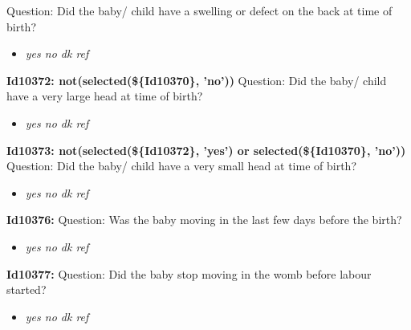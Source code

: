 \documentclass{article}%
\begin{document}
Question: Did the baby/ child have a swelling or defect on the back at time of birth?\newline%
%
\begin{itemize}%
\item%
\textit{yes\newline%
 no\newline%
 dk\newline%
 ref\newline%
}%
\end{itemize}%
\textbf{Id10372: not(selected(\$\{Id10370\}, 'no'))\newline%
}%
Question: Did the baby/ child have a very large head at time of birth?\newline%
%
\begin{itemize}%
\item%
\textit{yes\newline%
 no\newline%
 dk\newline%
 ref\newline%
}%
\end{itemize}%
\textbf{Id10373: not(selected(\$\{Id10372\}, 'yes') or selected(\$\{Id10370\}, 'no'))\newline%
}%
Question: Did the baby/ child have a very small head at time of birth?\newline%
%
\begin{itemize}%
\item%
\textit{yes\newline%
 no\newline%
 dk\newline%
 ref\newline%
}%
\end{itemize}%
\textbf{Id10376: \newline%
}%
Question: Was the baby moving in the last few days before the birth?\newline%
%
\begin{itemize}%
\item%
\textit{yes\newline%
 no\newline%
 dk\newline%
 ref\newline%
}%
\end{itemize}%
\textbf{Id10377: \newline%
}%
Question: Did the baby stop moving in the womb before labour started?\newline%
%
\begin{itemize}%
\item%
\textit{yes\newline%
 no\newline%
 dk\newline%
 ref\newline%
}%
\end{itemize}%
\end{document}
